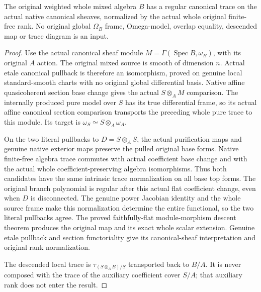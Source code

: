 \begin{theorem}
\label{thm:kn-nadel-canonical-mixed-descent}
\notready
The original weighted whole mixed algebra $B$ has a regular canonical
trace on the actual native canonical sheaves, normalized by the actual
whole original finite-free rank.  No original global $\Omega_B$ frame,
Omega-model, overlap equality, descended map or trace diagram is an input.
\end{theorem}
\begin{proof}
Use the actual canonical sheaf module
$M=\Gamma(\operatorname{Spec}B,\omega_B)$, with its original $A$ action.
The original mixed source is smooth of dimension $n$.  Actual etale
canonical pullback is therefore an isomorphism, proved on genuine local
standard-smooth charts with no original global differential basis.
Native affine quasicoherent section base change gives the actual
$S\otimes_A M$ comparison.  The internally produced pure model over $S$
has its true differential frame, so its actual affine canonical section
comparison transports the preceding whole pure trace to this module.
Its target is $\omega_S\simeq S\otimes_A\omega_A$.

On the two literal pullbacks to $D=S\otimes_A S$, the actual purification
maps and genuine native exterior maps preserve the pulled original base
forms.  Native finite-free algebra trace commutes with actual coefficient
base change and with the actual whole coefficient-preserving algebra
isomorphisms.  Thus both candidates have the same intrinsic trace
normalization on all base top forms.  The original branch polynomial is
regular after this actual flat coefficient change, even when $D$ is
disconnected.  The genuine power Jacobian identity and the whole source
frame make this normalization determine the entire functional, so the
two literal pullbacks agree.  The proved faithfully-flat module-morphism
descent theorem produces the original map and its exact whole scalar
extension.  Genuine etale pullback and section functoriality give its
canonical-sheaf interpretation and original rank normalization.

The descended local trace is $\tau_{(S\otimes_A B)/S}$ transported back
to $B/A$.  It is never composed with the trace of the auxiliary
coefficient cover $S/A$; that auxiliary rank does not enter the result.
\end{proof}

